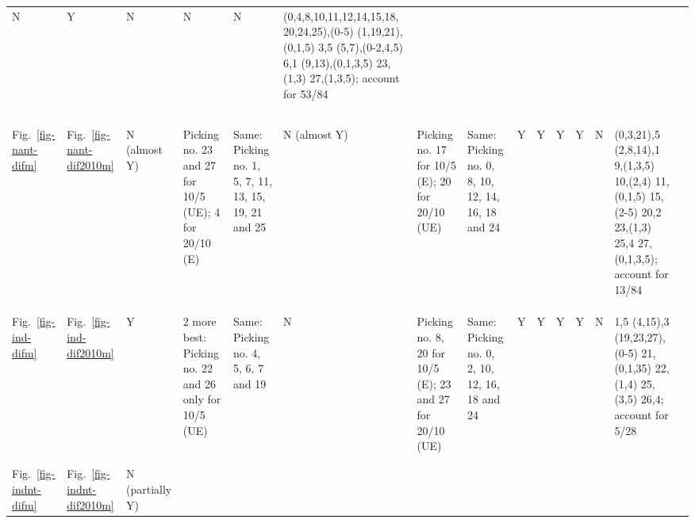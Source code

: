 \begin{table*}
{\begin{tabular}{l|l|l|l|p{2cm}|l|p{2.4cm}|l|lllllll}
  \multicolumn{1}{l|}{N} & \multicolumn{1}{l|}{Y} & \multicolumn{1}{l|}{N} &
  \multicolumn{1}{l|}{N} & \multicolumn{1}{l|}{N} &
  \multicolumn{1}{l|}{\multirow{2}{*}{\parbox{3cm}{(0,4,8,10,11,12,14,15,18, 20,24,25),(0-5)
  (1,19,21),(0,1,5) 3,5 (5,7),(0-2,4,5) 6,1 (9,13),(0,1,3,5) 23,(1,3)
  27,(1,3,5); account for 53/84}}} &
  \\ \\ \\ \\ \\ \\ \\ \hline
Fig.~\ref{fig-nant-difm} & Fig.~\ref{fig-nant-dif2010m} &
  \multirow{2}{*}{\parbox{1cm}{N (almost Y)}} &
  \multirow{2}{*}{\parbox{2.5cm}{Picking no. 23 and 27 for 10/5 (UE); 4 for 20/10 (E)}} &
  \multirow{2}{*}{\parbox{2cm}{Same: Picking no. 1, 5, 7, 11, 13, 15, 19, 21 and 25}} &
  \multirow{2}{*}{\parbox{1cm}{N (almost Y)}} &
  \multirow{2}{*}{\parbox{2cm}{Picking no. 17 for 10/5 (E); 20 for 20/10 (UE)}} &
  \multirow{2}{*}{\parbox{2cm}{Same: Picking no. 0, 8, 10, 12, 14, 16, 18 and 24}} &
  \multicolumn{1}{l|}{Y} & \multicolumn{1}{l|}{Y} & \multicolumn{1}{l|}{Y} &
  \multicolumn{1}{l|}{Y} & \multicolumn{1}{l|}{N} &
  \multicolumn{1}{l|}{\multirow{2}{*}{\parbox{3cm}{(0,3,21),5 (2,8,14),1
  9,(1,3,5) 10,(2,4) 11,(0,1,5) 15,(2-5) 20,2 23,(1,3) 25,4 27,(0,1,3,5);
  account for 13/84}}} &
  \\ \\ \\ \\ \\ \hline
Fig.~\ref{fig-ind-difm} & Fig.~\ref{fig-ind-dif2010m} & Y &
  \multirow{2}{*}{\parbox{2.5cm}{2 more best: Picking no. 22 and 26 only for 10/5 (UE)}} &
  \multirow{2}{*}{\parbox{2cm}{Same: Picking no. 4, 5, 6, 7 and 19}} &
  N & \multirow{2}{*}{\parbox{2.4cm}{Picking no. 8, 20 for 10/5 (E); 23 and 27 for 20/10 (UE)}} &
  \multirow{2}{*}{\parbox{2cm}{Same: Picking no. 0, 2, 10, 12, 16, 18 and 24}} &
  \multicolumn{1}{l|}{Y} & \multicolumn{1}{l|}{Y} & \multicolumn{1}{l|}{Y} &
  \multicolumn{1}{l|}{Y} & \multicolumn{1}{l|}{N} &
  \multicolumn{1}{l|}{\multirow{2}{*}{\parbox{3cm}{1,5 (4,15),3 (19,23,27),(0-5)
  21,(0,1,35) 22,(1,4) 25,(3,5) 26,4; account for 5/28}}} &  \\ \\ \\ \\ \hline
Fig.~\ref{fig-indnt-difm} & Fig.~\ref{fig-indnt-dif2010m} &
  \multirow{2}{*}{\parbox{1cm}{N (partially Y)}} &

\end{tabular}}
\end{table*}
